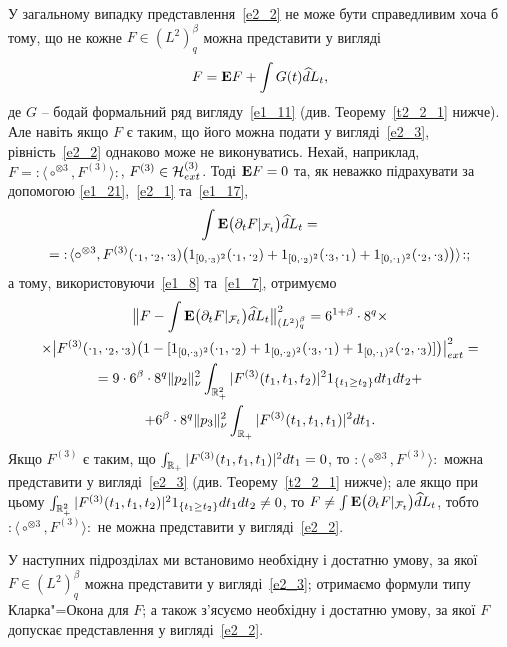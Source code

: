У загальному випадку представлення~\eqref{e2_2} не може бути справедливим хоча б тому, що
не кожне $F\in (L^2)^\beta_q$ можна представити у вигляді
\begin{equation}\label{e2_3}
F=\mathbf{E}{F}+\int G(t)\widehat dL_t,
\end{equation}
де $G$ -- бодай формальний ряд вигляду~\eqref{e1_11} (див. Теорему~\ref{t2_2_1} нижче).
Але навіть якщо $F$ є таким, що його можна подати у вигляді~\eqref{e2_3}, рівність~\eqref{e2_2}
однаково може не виконуватись. Нехай, наприклад,
$F={:\!\langle}\circ^{\otimes 3},F^{(3)}{\rangle\!:}$,
$F^{(3)}\in\mathcal{H}_{ext}^{(3)}$. Тоді $\mathbf{E}{F}=0$ та, як неважко підрахувати за допомогою
\eqref{e1_21},~\eqref{e2_1} та~\eqref{e1_17},
\begin{gather*}
\int\mathbf{E}\big(\partial_t F|_{\mathcal F_t}\big)\widehat dL_t=\\
={:\!\langle}\circ^{\otimes 3},F^{(3)}(\cdot_1,\cdot_2,\cdot_3)
\big(1_{[0,\cdot_3)^2}(\cdot_1,\cdot_2)+1_{[0,\cdot_2)^2}(\cdot_3,\cdot_1)
+1_{[0,\cdot_1)^2}(\cdot_2,\cdot_3)\big){\rangle\!:};
\end{gather*}
а тому, використовуючи~\eqref{e1_8} та~\eqref{e1_7}, отримуємо
\begin{gather*}
\big\|F-\int\mathbf{E}\big(\partial_t F|_{\mathcal F_t}\big)\widehat dL_t\big\|_{(L^2)^\beta_q}^2
=6^{1+\beta}\cdot 8^q\times\\
\times\big|F^{(3)}(\cdot_1,\cdot_2,\cdot_3)
\big(1-[1_{[0,\cdot_3)^2}(\cdot_1,\cdot_2)+1_{[0,\cdot_2)^2}(\cdot_3,\cdot_1)
+1_{[0,\cdot_1)^2}(\cdot_2,\cdot_3)]\big)\big|_{ext}^2=\\
=9\cdot 6^\beta\cdot 8^q\|p_2\|_\nu^2
\int_{\mathbb{R}_+^2}|F^{(3)}(t_1,t_1,t_2)|^21_{\{t_1\geq t_2\}}dt_1dt_2+\\
+6^\beta\cdot 8^q\|p_3\|_\nu^2
\int_{\mathbb{R}_+}|F^{(3)}(t_1,t_1,t_1)|^2dt_1.
\end{gather*}
Якщо $F^{(3)}$ є таким, що $\int_{\mathbb{R}_+}|F^{(3)}(t_1,t_1,t_1)|^2dt_1=0$, то
${:\!\langle}\circ^{\otimes 3},F^{(3)}{\rangle\!:}$ можна представити у вигляді~\eqref{e2_3}
(див. Теорему~\ref{t2_2_1} нижче); але якщо при цьому
$\int_{\mathbb{R}_+^2}|F^{(3)}(t_1,t_1,t_2)|^21_{\{t_1\geq t_2\}}dt_1dt_2\not=0$, то
$F\not=\int\mathbf{E}\big(\partial_t F|_{\mathcal F_t}\big)\widehat dL_t$, тобто
${:\!\langle}\circ^{\otimes 3},F^{(3)}{\rangle\!:}$ не можна представити у вигляді~\eqref{e2_2}.

У наступних підрозділах ми встановимо необхідну і достатню умову, за якої $F\in (L^2)^\beta_q$
можна представити у вигляді~\eqref{e2_3}; отримаємо формули типу Кларка"=Окона для $F$;
а також з'ясуємо необхідну і достатню умову, за якої $F$ допускає представлення
у вигляді~\eqref{e2_2}.


